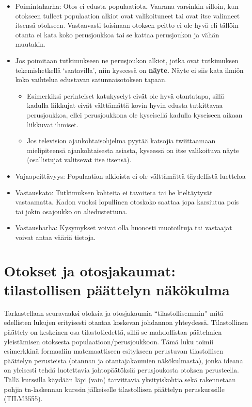 \documentclass[
]{book}
\providecommand{\tightlist}{%
  \setlength{\itemsep}{0pt}\setlength{\parskip}{0pt}}
\begin{document}
\begin{itemize}
\item
  Poimintaharha: Otos ei edusta populaatiota. Vaarana varsinkin silloin, kun otokseen tulleet populaation alkiot ovat valikoituneet tai ovat itse valinneet itsensä otokseen. Vastaavasti toisinaan otoksen peitto ei ole hyvä eli tällöin otanta ei kata koko perusjoukkoa tai se kattaa perusjoukon ja vähän muutakin.
\item
  Jos poimitaan tutkimukseen ne perusjoukon alkiot, jotka ovat tutkimuksen tekemishetkellä `saatavilla', niin kyseessä on \textbf{näyte}. Näyte ei siis kata ilmiön koko vaihtelua edustavan satunnaisotoksen tapaan.

  \begin{itemize}
  \tightlist
  \item
    Esimerkiksi perinteiset katukyselyt eivät ole hyvä otantatapa, sillä kadulla liikkujat eivät välttämättä kovin hyvin edusta tutkittavaa perusjoukkoa, ellei perusjoukkona ole kyseisellä kadulla kyseiseen aikaan liikkuvat ihmiset.
  \item
    Jos television ajankohtaisohjelma pyytää katsojia twiittaamaan mielipiteensä ajankohtaisesta asiasta, kyseessä on itse valikoituva näyte (osallistujat valitsevat itse itsensä).
  \end{itemize}
\item
  Vajaapeittävyys: Populaation alkioista ei ole välttämättä täydellistä luetteloa
\item
  Vastauskato: Tutkimuksen kohteita ei tavoiteta tai he kieltäytyvät vastaamatta. Kadon vuoksi lopullinen otoskoko saattaa jopa karsiutua pois tai jokin osajoukko on aliedustettuna.
\item
  Vastausharha: Kysymykset voivat olla huonosti muotoiltuja tai vastaajat voivat antaa vääriä tietoja.
\end{itemize}

\hypertarget{luku6}{%
\chapter{Otokset ja otosjakaumat: tilastollisen päättelyn näkökulma}\label{luku6}}

Tarkastellaan seuravaaksi otoksia ja otosjakaumia ``tilastollisemmin'' mitä edellisten lukujen erityisesti otantaa koskevan johdannon yhteydessä. Tilastollinen päättely on keskeinen osa tilastotiedettä, sillä se mahdollistaa päätelmien yleistämisen otoksesta populaatioon/perusjoukkoon. Tämä luku toimii esimerkkinä formaaliin matemaattiseen esitykseen perustuvan tilastollisen päättelyn perusteista (otannan ja otantajakaumien näkökulmasta), jonka ideana on yleisesti tehdä luotettavia johtopäätöksiä perusjoukosta otoksen perusteella. Tällä kurssilla käydään läpi (vain) tarvittavia yksityiskohtia sekä rakennetaan pohjia tn-laskennan kurssin jälkeiselle tilastollisen päättelyn peruskurssille (TILM3555).
\end{document}
